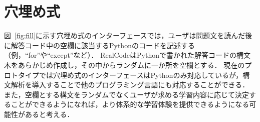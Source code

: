 \section{穴埋め式}

図~\ref{fig:fill}に示す穴埋め式のインターフェースでは，ユーザは問題文を読んだ後に解答コード中の空欄に該当するPythonのコードを記述する（例，``for''や``except''など）．
RealCodeはPythonで書かれた解答コードの構文木をあらかじめ作成し，その中からランダムに一か所を空欄とする．
現在のプロトタイプでは穴埋め式のインターフェースはPythonのみ対応しているが，構文解析を導入することで他のプログラミング言語にも対応することができる．
また，空欄とする構文をランダムでなくユーザが求める学習内容に応じて決定することができるようになれば，より体系的な学習体験を提供できるようになる可能性があると考える．


